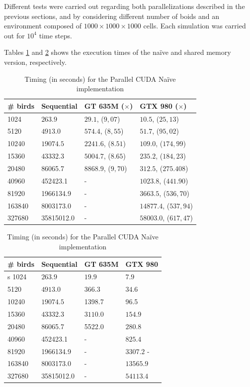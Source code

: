 Different tests were carried out regarding both parallelizations described in the previous sections, and by considering different number of boids and an environment composed of $1000 \times 1000 \times 1000 $ cells. Each simulation was carried out for $10^4$ time steps. 

Tables \ref{tab:naive} and \ref{tab:ifdiv} shows the execution times of the na\"ive and shared memory version, respectively.
\begin{table} [h!]
	\centering
	\begin{tabular}{|l |l |l| l|}
		\hline
		\# birds & Sequential & GT	635M ($\times$) & GTX 980 ($\times$) 
		\\
		\hline
		
		1024  	& \(263.9\) 	& $29.1$, ($9,07$) 	& $10.5$, ($25,13$) \\
		5120  	& \(4913.0\) 	& $574.4$, ($8,55$) 	& $51.7$, ($95,02$)  \\
		10240 	&  $19074.5$ 	& $2241.6$, ($8.51$) 	& $109.0$, ($174,99$)  \\
		15360 	& \(43332.3\) 	& $5004.7$, ($8.65$) 	& $235.2$, ($184,23$)  \\
		20480  	& 86065.7 		& $8868.9$, ($9,70$) 	& $312.5$, ($275.408$) \\
		40960  	& 452423.1 		& - 						& $1023.8$, ($441.90$)  \\
		81920  	& 1966134.9 	& - 						& $3663.5$, ($536,70$)  \\
		163840  & 8003173.0 	& - 						& $14877.4$, ($537,94$)	 \\
		327680  & 35815012.0 	& - 						& $58003.0$, ($617,47$)  \\
		\hline
	\end{tabular}
	\caption{Timing (in seconds) for the Parallel CUDA Na\"ive implementation}
	\label{tab:naive}
\end{table}

\begin{table} [h!]
	\centering
	\begin{tabular}{|l |l |l| l|}
		\hline
		\# birds & Sequential & GT	635M & GTX 980
		\\
		\hline
		s
		1024  & \(263.9\) & $19.9$ & $7.9$  \\
		5120  & \(4913.0\) & $366.3$ & $34.6$  \\
		10240 &  $19074.5$ & 1398.7 & 96.5  \\
		15360  & \(43332.3\) & $3110.0$ & $154.9$  \\
		20480  & 86065.7 & 5522.0 & $280.8$ \\
		40960  & 452423.1 & - & $825.4$ \\
		81920  & 1966134.9 & - & $3307.2$ - \\
		163840  & 8003173.0 & - & $13565.9$ \\
		327680  & 35815012.0 & - & $54113.4$  \\
		\hline
	\end{tabular}
	\caption{Timing (in seconds) for the Parallel CUDA Na\"ive implementation}
	\label{tab:ifdiv}
\end{table}

